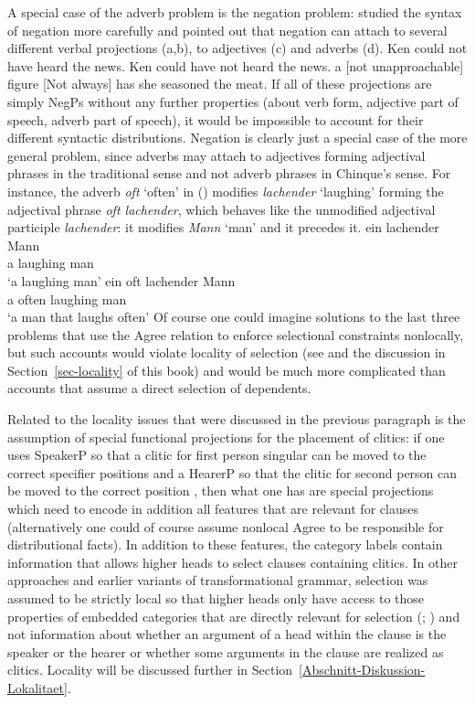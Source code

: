 A special case of the adverb problem is the negation
problem: \citet{Ernst92a} studied the syntax of negation more carefully and pointed out that
negation can attach to several different verbal projections (a,b), to adjectives (c)
and adverbs (d).
\eal
\ex Ken could not have heard the news.
\ex Ken could have not heard the news.
\ex a [not unapproachable] figure
\ex {}[Not always] has she seasoned the meat.
\zl
If all of these projections are simply NegPs without any further properties (about verb form, adjective
part of speech, adverb part of speech), it would be impossible to account for their different
syntactic distributions. Negation is clearly just a special case of the more general problem, since
adverbs may attach to adjectives forming adjectival phrases in the traditional sense and not adverb
phrases in Chinque's sense. For instance, the adverb \emph{oft} `often' in () modifies
\emph{lachender} `laughing' forming the adjectival phrase \emph{oft lachender}, which behaves like the
unmodified adjectival participle \emph{lachender}: it modifies \emph{Mann} `man' and it precedes it.
\eal
\ex
\gll ein lachender Mann\\
     a   laughing man\\
\glt `a laughing man'
\ex
\gll ein oft lachender Mann\\
     a   often laughing man\\
\glt `a man that laughs often'
\zl     
Of course one could imagine solutions to the last three problems that use the Agree relation to enforce selectional
constraints nonlocally, but such accounts would violate locality of selection (see \citealp[]{Ernst92a} and the discussion in
Section~\ref{sec-locality} of this book) and would be much more complicated than accounts
that assume a direct selection of dependents.


Related to the locality issues that were discussed in the previous paragraph is the assumption of
special functional projections for the placement of clitics: if one uses
SpeakerP so that a clitic for first person singular can be moved to
the correct specifier positions and a HearerP so that the clitic for
second person can be moved to the correct position \citep[]{Poletto2000a-u}, then what one
has are special projections which need to encode in addition all features that are relevant for
clauses (alternatively one could of course assume nonlocal Agree to be responsible for distributional facts). In
addition to these features, the category labels contain information that allows higher heads to select clauses
containing clitics. In other approaches and earlier variants of transformational grammar, selection
was assumed to be strictly local so that higher heads only have access to those
properties of embedded categories that are directly relevant for selection (\citealp[]{Abraham2005a}; \citealp{Sag2007a}) and not information about whether an argument of a head within the clause is
the speaker or the hearer or whether some arguments in the clause are realized as clitics. Locality
will be discussed further in Section~\ref{Abschnitt-Diskussion-Lokalitaet}.

